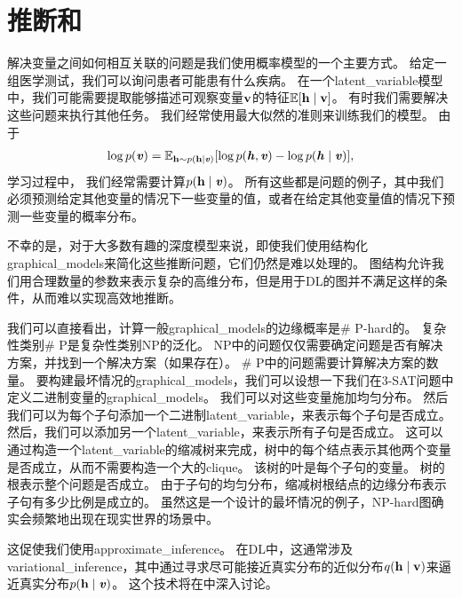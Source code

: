 \section{推断和}
\label{sec:inference_and_approximate_inference}


解决变量之间如何相互关联的问题是我们使用概率模型的一个主要方式。 
给定一组医学测试，我们可以询问患者可能患有什么疾病。
在一个\gls{latent_variable}模型中，我们可能需要提取能够描述可观察变量$\mathbf{v}$的特征$\mathbb{E}[\mathbf{h} \mid \mathbf{v}]$。
有时我们需要解决这些问题来执行其他任务。 
我们经常使用最大似然的准则来训练我们的模型。
由于
\begin{align}
\label{eqn:169}
\log p(\boldsymbol{\mathit{v}}) = \mathbb{E}_{\mathbf{h} \sim p(\mathbf{h}\mid \boldsymbol{\mathit{v}})} [\log p(\boldsymbol{\mathit{h}},\boldsymbol{\mathit{v}}) -  \log p(\boldsymbol{\mathit{h}}\mid\boldsymbol{\mathit{v}})],
\end{align}
学习过程中，%
我们经常需要计算$p(\mathbf{h}\mid\boldsymbol{\mathit{v}})$。
所有这些都是问题的例子，其中我们必须预测给定其他变量的情况下一些变量的值，或者在给定其他变量值的情况下预测一些变量的概率分布。

不幸的是，对于大多数有趣的深度模型来说，即使我们使用结构化\gls{graphical_models}来简化这些推断问题，它们仍然是难以处理的。
图结构允许我们用合理数量的参数来表示复杂的高维分布，但是用于\gls{DL}的图并不满足这样的条件，从而难以实现高效地推断。


我们可以直接看出，计算一般\gls{graphical_models}的边缘概率是\# P-hard的。
复杂性类别\# P是复杂性类别NP的泛化。
NP中的问题仅仅需要确定问题是否有解决方案，并找到一个解决方案（如果存在）。%
\# P中的问题需要计算解决方案的数量。
要构建最坏情况的\gls{graphical_models}，我们可以设想一下我们在3-SAT问题中定义二进制变量的\gls{graphical_models}。
我们可以对这些变量施加均匀分布。
然后我们可以为每个子句添加一个二进制\gls{latent_variable}，来表示每个子句是否成立。
然后，我们可以添加另一个\gls{latent_variable}，来表示所有子句是否成立。
这可以通过构造一个\gls{latent_variable}的缩减树来完成，树中的每个结点表示其他两个变量是否成立，从而不需要构造一个大的\gls{clique}。
该树的叶是每个子句的变量。
树的根表示整个问题是否成立。
由于子句的均匀分布，缩减树根结点的边缘分布表示子句有多少比例是成立的。
虽然这是一个设计的最坏情况的例子，NP-hard图确实会频繁地出现在现实世界的场景中。


这促使我们使用\gls{approximate_inference}。
在\gls{DL}中，这通常涉及\gls{variational_inference}，其中通过寻求尽可能接近真实分布的近似分布$q(\mathbf{h}\mid\mathbf{v})$来逼近真实分布$p(\mathbf{h}\mid\boldsymbol{\mathit{v}})$。
这个技术将在中深入讨论。



